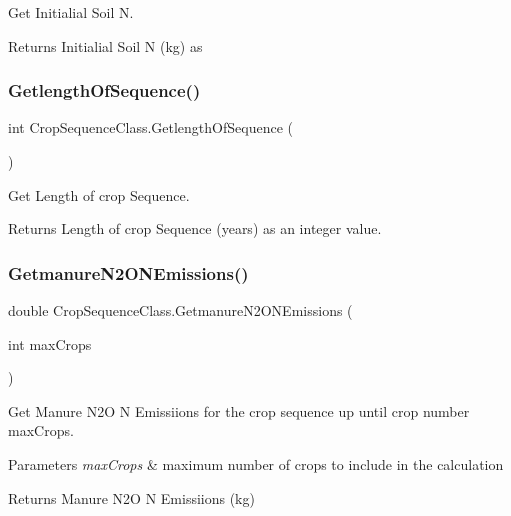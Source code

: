 Get Initialial Soil N. 

\begin{DoxyReturn}{Returns}
Initialial Soil N (kg) as 
\end{DoxyReturn}
\mbox{\label{class_crop_sequence_class_aab561714ad5498801165de8087d24d16}} 
\subsubsection{\texorpdfstring{GetlengthOfSequence()}{GetlengthOfSequence()}}
{\footnotesize\ttfamily int Crop\+Sequence\+Class.\+Getlength\+Of\+Sequence (\begin{DoxyParamCaption}{ }\end{DoxyParamCaption})\hspace{0.3cm}{\ttfamily [inline]}}



Get Length of crop Sequence. 

\begin{DoxyReturn}{Returns}
Length of crop Sequence (years) as an integer value. 
\end{DoxyReturn}
\mbox{\label{class_crop_sequence_class_a6483d720e357417e677ef60d3dd926dc}} 
\subsubsection{\texorpdfstring{GetmanureN2ONEmissions()}{GetmanureN2ONEmissions()}}
{\footnotesize\ttfamily double Crop\+Sequence\+Class.\+Getmanure\+N2\+O\+N\+Emissions (\begin{DoxyParamCaption}\item[{int}]{max\+Crops }\end{DoxyParamCaption})\hspace{0.3cm}{\ttfamily [inline]}}



Get Manure N2O N Emissiions for the crop sequence up until crop number max\+Crops. 


\begin{DoxyParams}{Parameters}
{\em max\+Crops} & maximum number of crops to include in the calculation \\
\hline
\end{DoxyParams}
\begin{DoxyReturn}{Returns}
Manure N2O N Emissiions (kg) 
\end{DoxyReturn}
\mbox{\label{class_crop_sequence_class_a1924ad8fa6a78b9e34d23251a32f2f62}} 
